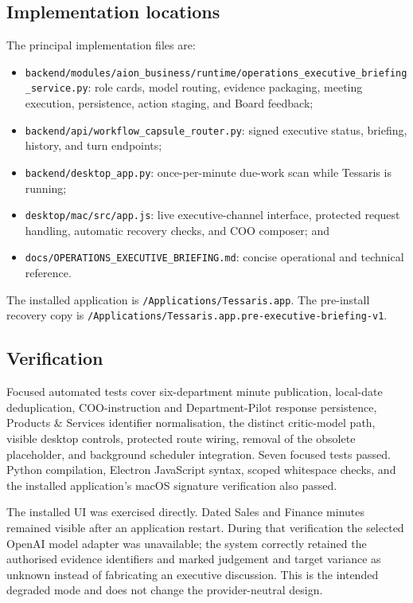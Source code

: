 \subsection{Implementation locations}

The principal implementation files are:
\begin{itemize}[leftmargin=*]
\item \texttt{backend/modules/aion\_business/runtime/operations\_executive\_briefing\_service.py}:
      role cards, model routing, evidence packaging, meeting execution, persistence, action staging,
      and Board feedback;
\item \texttt{backend/api/workflow\_capsule\_router.py}: signed executive status, briefing,
      history, and turn endpoints;
\item \texttt{backend/desktop\_app.py}: once-per-minute due-work scan while Tessaris is running;
\item \texttt{desktop/mac/src/app.js}: live executive-channel interface, protected request handling,
      automatic recovery checks, and COO composer; and
\item \texttt{docs/OPERATIONS\_EXECUTIVE\_BRIEFING.md}: concise operational and technical reference.
\end{itemize}

The installed application is \texttt{/Applications/Tessaris.app}.  The pre-install recovery copy is
\texttt{/Applications/Tessaris.app.pre-executive-briefing-v1}.

\subsection{Verification}

Focused automated tests cover six-department minute publication, local-date deduplication,
COO-instruction and Department-Pilot response persistence, Products \& Services identifier
normalisation, the distinct critic-model path, visible desktop controls, protected route wiring,
removal of the obsolete placeholder, and background scheduler integration.  Seven focused tests
passed.  Python compilation, Electron JavaScript syntax, scoped whitespace checks, and the installed
application's macOS signature verification also passed.

The installed UI was exercised directly.  Dated Sales and Finance minutes remained visible after an
application restart.  During that verification the selected OpenAI model adapter was unavailable;
the system correctly retained the authorised evidence identifiers and marked judgement and target
variance as unknown instead of fabricating an executive discussion.  This is the intended degraded
mode and does not change the provider-neutral design.

